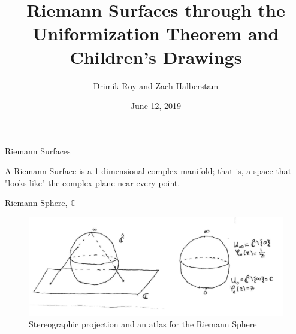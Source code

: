 \documentclass{beamer}
\title[Uniformization Theorem and Children's Drawings]{Riemann Surfaces through the Uniformization Theorem and Children's Drawings}
\author{Drimik Roy and Zach Halberstam}
\institute{University of Michigan}
\date{June 12, 2019}
\newcommand{\CC}{\mathbb{C}}
\begin{document}
\begin{frame}
    \titlepage
\end{frame}
\begin{frame}{Riemann Surfaces}
\begin{definition}
    A Riemann Surface is a 1-dimensional complex manifold; that is, a space that "looks like" the complex plane near every point.
\end{definition}
\begin{examples}
Riemann Sphere, $\CC$ 
\end{examples}
\begin{figure}
\includegraphics[scale=0.15]{images_talk/riemannsphere.jpeg}
\caption{Stereographic projection and an atlas for the Riemann Sphere}
\end{figure}

\end{frame}
\end{document}
